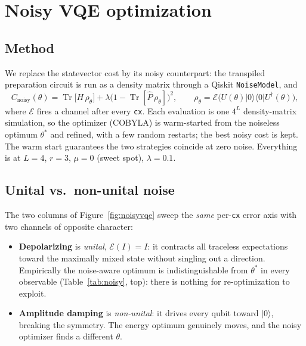\documentclass[11pt]{article}
\newcommand{\Pop}{\hat{P}}
\newcommand{\ket}[1]{|#1\rangle}
\newcommand{\dyad}[1]{|#1\rangle\langle#1|}
\newcommand{\Tr}{\operatorname{Tr}}
\newcommand{\cx}{\texttt{cx}}
\begin{document}
\section{Noisy VQE optimization}
\label{sec:noisy}

\subsection{Method}

We replace the statevector cost by its noisy counterpart: the transpiled
preparation circuit is run as a density matrix through a Qiskit
\texttt{NoiseModel}, and
\begin{equation}
  C_{\text{noisy}}(\theta)
  = \Tr\!\bigl[H\,\rho_\theta\bigr]
  + \lambda\bigl(1-\Tr[\Pop\,\rho_\theta]\bigr)^2 ,
  \qquad \rho_\theta = \mathcal{E}\bigl(U(\theta)\dyad{0}U^\dagger(\theta)\bigr),
\end{equation}
where $\mathcal{E}$ fires a channel after every \cx{}. Each evaluation is one $4^L$
density-matrix simulation, so the optimizer (COBYLA) is warm-started from the
noiseless optimum $\theta^\ast$ and refined, with a few random restarts; the best
noisy cost is kept. The warm start guarantees the two strategies coincide at zero
noise. Everything is at $L=4$, $r=3$, $\mu=0$ (sweet spot), $\lambda=0.1$.

\subsection{Unital vs.\ non-unital noise}

The two columns of Figure~\ref{fig:noisyvqe} sweep the \emph{same} per-\cx{} error
axis with two channels of opposite character:
\begin{itemize}
  \item \textbf{Depolarizing} is \emph{unital}, $\mathcal{E}(I)=I$: it contracts all
        traceless expectations toward the maximally mixed state without singling out
        a direction. Empirically the noise-aware optimum is indistinguishable from
        $\theta^\ast$ in every observable (Table~\ref{tab:noisy}, top): there is
        nothing for re-optimization to exploit.
  \item \textbf{Amplitude damping} is \emph{non-unital}: it drives every qubit toward
        $\ket{0}$, breaking the symmetry. The energy optimum genuinely moves, and the
        noisy optimizer finds a different $\theta$.
\end{itemize}
\end{document}
